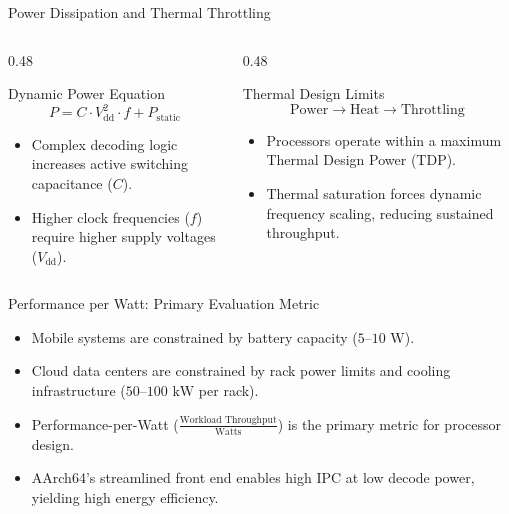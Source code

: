 \documentclass[aspectratio=169,11pt,t]{beamer}
\begin{document}

\begin{frame}{Power Dissipation and Thermal Throttling}
\begin{columns}[T,onlytextwidth]
\begin{column}{0.48\textwidth}
\begin{block}{Dynamic Power Equation}
$$P = C \cdot V_{\text{dd}}^2 \cdot f + P_{\text{static}}$$
\begin{itemize}\setlength{\itemsep}{4pt}
  \item Complex decoding logic increases active switching capacitance ($C$).
  \item Higher clock frequencies ($f$) require higher supply voltages ($V_{\text{dd}}$).
\end{itemize}
\end{block}
\end{column}

\begin{column}{0.48\textwidth}
\begin{block}{Thermal Design Limits}
$$\text{Power} \longrightarrow \text{Heat} \longrightarrow \text{Throttling}$$
\begin{itemize}\setlength{\itemsep}{4pt}
  \item Processors operate within a maximum Thermal Design Power (TDP).
  \item Thermal saturation forces dynamic frequency scaling, reducing sustained throughput.
\end{itemize}
\end{block}
\end{column}
\end{columns}
\end{frame}


\begin{frame}{Performance per Watt: Primary Evaluation Metric}
\large
\begin{itemize}\setlength{\itemsep}{8pt}
  \item Mobile systems are constrained by battery capacity ($5\text{--}10\text{ W}$).
  \item Cloud data centers are constrained by rack power limits and cooling infrastructure ($50\text{--}100\text{ kW}$ per rack).
  \item Performance-per-Watt ($\frac{\text{Workload Throughput}}{\text{Watts}}$) is the primary metric for processor design.
  \item AArch64's streamlined front end enables high IPC at low decode power, yielding high energy efficiency.
\end{itemize}
\end{frame}
\end{document}

